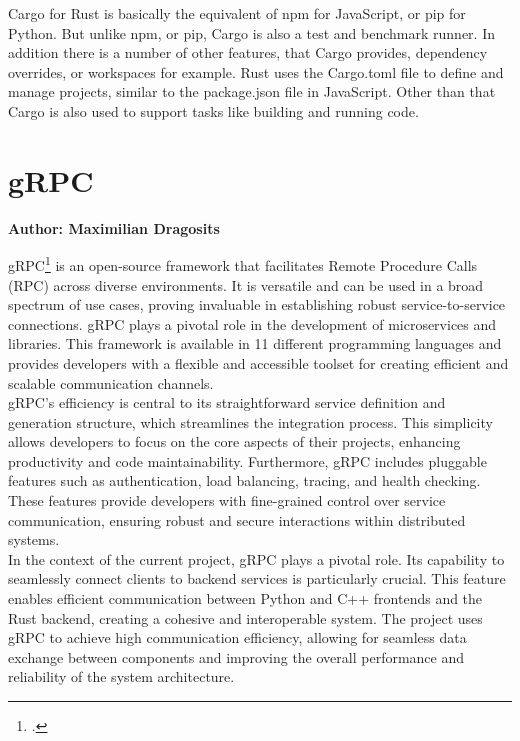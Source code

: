 Cargo for Rust is basically the equivalent of npm for JavaScript, or pip for Python. But unlike npm, or pip, Cargo is also a test and benchmark runner. In addition there is 
a number of other features, that Cargo provides, dependency overrides, or workspaces for example. Rust uses the Cargo.toml file to define and manage projects, similar to the 
package.json file in JavaScript. Other than that Cargo is also used to support tasks like building and running code.

\section{gRPC}
\textbf{Author: Maximilian Dragosits}

gRPC\footcite{grpc_main_site} is an open-source framework that facilitates Remote Procedure Calls (RPC) across diverse environments. It is versatile 
and can be used in a broad spectrum of use cases, proving invaluable in establishing robust service-to-service connections. gRPC plays a pivotal role in the 
development of microservices and libraries. This framework is available in 11 different programming languages and provides developers with a flexible 
and accessible toolset for creating efficient and scalable communication channels.\\

gRPC's efficiency is central to its straightforward service definition and generation structure, which streamlines the integration process. 
This simplicity allows developers to focus on the core aspects of their projects, enhancing productivity and code maintainability. Furthermore, gRPC includes 
pluggable features such as authentication, load balancing, tracing, and health checking. These features provide developers with fine-grained control over 
service communication, ensuring robust and secure interactions within distributed systems.\\

In the context of the current project, gRPC plays a pivotal role. Its capability to seamlessly connect clients to backend services is particularly crucial. 
This feature enables efficient communication between Python and C++ frontends and the Rust backend, creating a cohesive and interoperable system. The project 
uses gRPC to achieve high communication efficiency, allowing for seamless data exchange between components and improving the overall performance and reliability 
of the system architecture.

